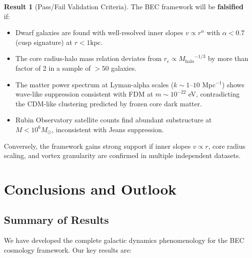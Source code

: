 \documentclass[11pt,a4paper]{article}
\newcommand{\Msun}{\ensuremath{M_\odot}}
\newcommand{\Mhalo}{\ensuremath{M_{\mathrm{halo}}}}
\newcommand{\kpc}{\ensuremath{\mathrm{kpc}}}
\newcommand{\rc}{\ensuremath{r_{\mathrm{c}}}}
\theoremstyle{definition}
\newtheorem{result}{Result}[section]
\theoremstyle{remark}
\begin{document}
\begin{result}[Pass/Fail Validation Criteria]
The BEC framework will be \textbf{falsified} if:
\begin{itemize}[leftmargin=*]
\item Dwarf galaxies are found with well-resolved inner slopes $v \propto r^{\alpha}$ with $\alpha < 0.7$ (cusp signature) at $r < 1 \kpc$.
\item The core radius-halo mass relation deviates from $\rc \propto \Mhalo^{-1/3}$ by more than factor of 2 in a sample of $>50$ galaxies.
\item The matter power spectrum at Lyman-alpha scales ($k \sim 1$--$10$ Mpc$^{-1}$) shows wave-like suppression consistent with FDM at $m \sim 10^{-22}$ eV, contradicting the CDM-like clustering predicted by frozen core dark matter.
\item Rubin Observatory satellite counts find abundant substructure at $M < 10^6 \Msun$, inconsistent with Jeans suppression.
\end{itemize}

Conversely, the framework gains strong support if inner slopes $v \propto r$, core radius scaling, and vortex granularity are confirmed in multiple independent datasets.
\end{result}

\section{Conclusions and Outlook}
\label{sec:conclusions}

\subsection{Summary of Results}
\label{sec:summary}

We have developed the complete galactic dynamics phenomenology for the BEC cosmology framework. Our key results are:
\end{document}
